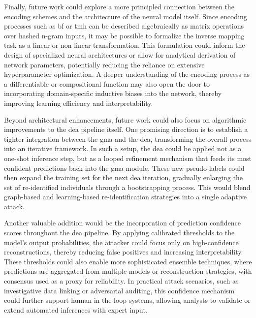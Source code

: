 Finally, future work could explore a more principled connection between the encoding schemes and the architecture of the neural model itself.
Since encoding processes such as \ac{bf} or \ac{tmh} can be described algebraically as matrix operations over hashed n-gram inputs, it may be possible to formalize the inverse mapping task as a linear or non-linear transformation.
This formulation could inform the design of specialized neural architectures or allow for analytical derivation of network parameters, potentially reducing the reliance on extensive hyperparameter optimization.
A deeper understanding of the encoding process as a differentiable or compositional function may also open the door to incorporating domain-specific inductive biases into the network, thereby improving learning efficiency and interpretability.

Beyond architectural enhancements, future work could also focus on algorithmic improvements to the \ac{dea} pipeline itself.
One promising direction is to establish a tighter integration between the \ac{gma} and the \ac{dea}, transforming the overall process into an iterative framework.
In such a setup, the \ac{dea} could be applied not as a one-shot inference step, but as a looped refinement mechanism that feeds its most confident predictions back into the \ac{gma} module.
These new pseudo-labels could then expand the training set for the next \ac{dea} iteration, gradually enlarging the set of re-identified individuals through a bootstrapping process.
This would blend graph-based and learning-based re-identification strategies into a single adaptive attack.

Another valuable addition would be the incorporation of prediction confidence scores throughout the \ac{dea} pipeline.
By applying calibrated thresholds to the model’s output probabilities, the attacker could focus only on high-confidence reconstructions, thereby reducing false positives and increasing interpretability.
These thresholds could also enable more sophisticated ensemble techniques, where predictions are aggregated from multiple models or reconstruction strategies, with consensus used as a proxy for reliability.
In practical attack scenarios, such as investigative data linking or adversarial auditing, this confidence mechanism could further support human-in-the-loop systems, allowing analysts to validate or extend automated inferences with expert input.

